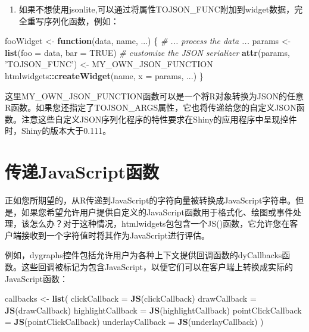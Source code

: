 \documentclass[]{book}
\newenvironment{Shaded}{\begin{snugshade}}{\end{snugshade}}
\newcommand{\KeywordTok}[1]{\textcolor[rgb]{0.13,0.29,0.53}{\textbf{#1}}}
\newcommand{\DataTypeTok}[1]{\textcolor[rgb]{0.13,0.29,0.53}{#1}}
\newcommand{\StringTok}[1]{\textcolor[rgb]{0.31,0.60,0.02}{#1}}
\newcommand{\CommentTok}[1]{\textcolor[rgb]{0.56,0.35,0.01}{\textit{#1}}}
\newcommand{\OtherTok}[1]{\textcolor[rgb]{0.56,0.35,0.01}{#1}}
\newcommand{\ControlFlowTok}[1]{\textcolor[rgb]{0.13,0.29,0.53}{\textbf{#1}}}
\newcommand{\OperatorTok}[1]{\textcolor[rgb]{0.81,0.36,0.00}{\textbf{#1}}}
\newcommand{\NormalTok}[1]{#1}
\providecommand{\tightlist}{%
  \setlength{\itemsep}{0pt}\setlength{\parskip}{0pt}}
\theoremstyle{definition}
\theoremstyle{definition}
\theoremstyle{definition}
\theoremstyle{remark}
\begin{document}
\begin{enumerate}
\def\labelenumi{\arabic{enumi}.}
\setcounter{enumi}{1}
\tightlist
\item
  如果不想使用jsonlite,可以通过将属性TOJSON\_FUNC附加到widget数据，完全重写序列化函数，例如：
\end{enumerate}

\begin{Shaded}
\begin{Highlighting}[]
\NormalTok{fooWidget <-}\StringTok{ }\ControlFlowTok{function}\NormalTok{(data, name, ...) \{}
  \CommentTok{# ... process the data ...}
\NormalTok{  params <-}\StringTok{ }\KeywordTok{list}\NormalTok{(}\DataTypeTok{foo =}\NormalTok{ data, }\DataTypeTok{bar =} \OtherTok{TRUE}\NormalTok{)}
  \CommentTok{# customize the JSON serializer}
  \KeywordTok{attr}\NormalTok{(params, }\StringTok{'TOJSON_FUNC'}\NormalTok{) <-}\StringTok{ }\NormalTok{MY_OWN_JSON_FUNCTION}
\NormalTok{  htmlwidgets}\OperatorTok{::}\KeywordTok{createWidget}\NormalTok{(name, }\DataTypeTok{x =}\NormalTok{ params, ...)}
\NormalTok{\}}
\end{Highlighting}
\end{Shaded}

这里MY\_OWN\_JSON\_FUNCTION函数可以是一个将R对象转换为JSON的任意R函数。如果您还指定了TOJSON\_ARGS属性，它也将传递给您的自定义JSON函数。注意这些自定义JSON序列化程序的特性要求在Shiny的应用程序中呈现控件时，Shiny的版本大于0.111。

\section{传递JavaScript函数}\label{javascript}

正如您所期望的，从R传递到JavaScript的字符向量被转换成JavaScript字符串。但是，如果您希望允许用户提供自定义的JavaScript函数用于格式化、绘图或事件处理，该怎么办？对于这种情况，htmlwidgets包包含一个JS()函数，它允许您在客户端接收到一个字符值时将其作为JavaScript进行评估。

例如，dygraphs控件包括允许用户为各种上下文提供回调函数的dyCallbacks函数。这些回调被标记为包含JavaScript，以便它们可以在客户端上转换成实际的JavaScript函数：

\begin{Shaded}
\begin{Highlighting}[]
\NormalTok{callbacks <-}\StringTok{ }\KeywordTok{list}\NormalTok{(}
  \DataTypeTok{clickCallback =} \KeywordTok{JS}\NormalTok{(clickCallback)}
  \DataTypeTok{drawCallback =} \KeywordTok{JS}\NormalTok{(drawCallback)}
  \DataTypeTok{highlightCallback =} \KeywordTok{JS}\NormalTok{(highlightCallback)}
  \DataTypeTok{pointClickCallback =} \KeywordTok{JS}\NormalTok{(pointClickCallback)}
  \DataTypeTok{underlayCallback =} \KeywordTok{JS}\NormalTok{(underlayCallback)}
\NormalTok{)}
\end{Highlighting}
\end{Shaded}
\end{document}
